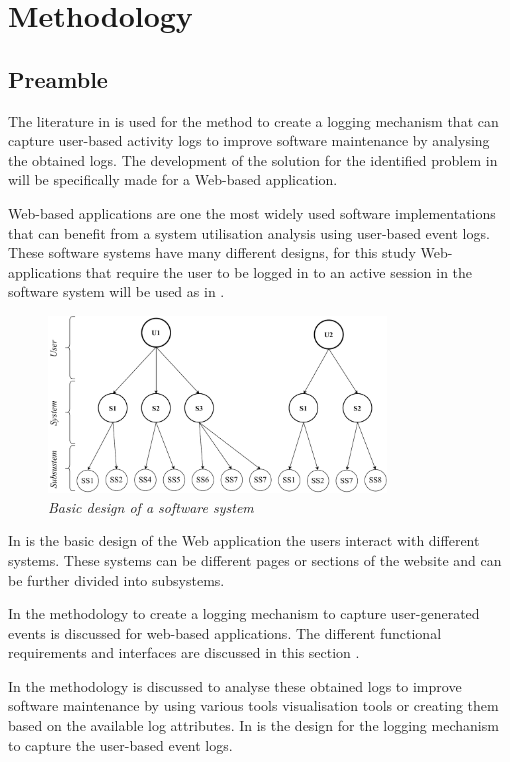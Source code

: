 \chapter{Methodology}
\label{chap:2}

\section{Preamble}\label{sec:ch2_preamble}
 The literature in  is used for the method to create a logging mechanism that can capture user-based activity logs to improve software maintenance by analysing the obtained logs. The development of the solution for the identified problem in  will be specifically made for a Web-based application.\par Web-based applications are one the most widely used software implementations that can benefit from a system utilisation analysis using user-based event logs. These software systems have many different designs, for this study Web-applications that require the user to be logged in to an active session in the software system will be used as in .

 \begin{figure}[!htb]
	\centering %
	\includegraphics[width=0.8\textwidth]{img/Chapter2/systemOverview/systemOverview.pdf}
	\caption[Basic design of a software system]
	{\textit{Basic design of a software system}}\label{fig:ch2_webSystemBasic}
\end{figure}
 
 In  is the basic design of the Web application the users interact with different systems. These systems can be different pages or sections of the website and can be further divided into subsystems. \par In  the methodology to create a logging mechanism to capture user-generated events is discussed for web-based applications. The different functional requirements and interfaces are discussed in this section \cite{Anish2015}.\par In  the methodology is discussed to analyse these obtained logs to improve software maintenance by using various tools visualisation tools or creating them based on the available log attributes. In  is the design for the logging mechanism to capture the user-based event logs.

